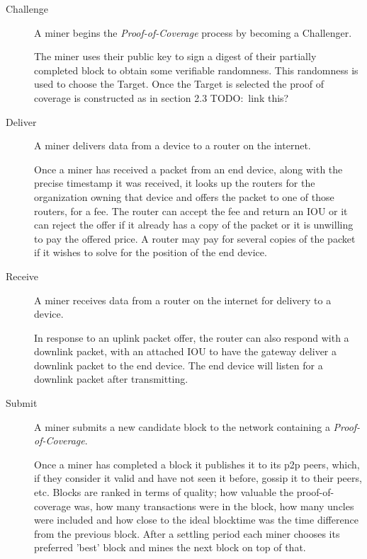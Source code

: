 \documentclass[letterpaper,11pt]{article}
\newcommand{\todo}[1]{}
\renewcommand{\todo}[1]{{\color{red} TODO:\ {#1}}}
\begin{document}
\begin{description}
  \item [Challenge] A miner begins the \emph{Proof-of-Coverage} process by becoming a Challenger.

    The miner uses their public key to sign a digest of their partially completed block to obtain some verifiable randomness. This randomness is used to choose the Target. Once the Target is selected the proof of coverage is constructed as in section 2.3 \todo{link this?}

\item [Deliver] A miner delivers data from a device to a router on the internet.\label{cycle:miner:deliver}

    Once a miner has received a packet from an end device, along with the precise timestamp it was received, it looks up the routers for the organization owning that device and offers the packet to one of those routers, for a fee. The router can accept the fee and return an IOU or it can reject the offer if it already has a copy of the packet or it is unwilling to pay the offered price. A router may pay for several copies of the packet if it wishes to solve for the position of the end device.

  \item [Receive] A miner receives data from a router on the internet for delivery to a device.

    In response to an uplink packet offer, the router can also respond with a downlink packet, with an attached IOU to have the gateway deliver a downlink packet to the end device. The end device will listen for a downlink packet after transmitting.

  \item [Submit] A miner submits a new candidate block to the network containing a \emph{Proof-of-Coverage}.

    Once a miner has completed a block it publishes it to its p2p peers, which, if they consider it valid and have not seen it before, gossip it to their peers, etc. Blocks are ranked in terms of quality; how valuable the proof-of-coverage was, how many transactions were in the block, how many uncles were included and how close to the ideal blocktime was the time difference from the previous block. After a settling period each miner chooses its preferred 'best' block and mines the next block on top of that.

\end{description}



\end{document}
